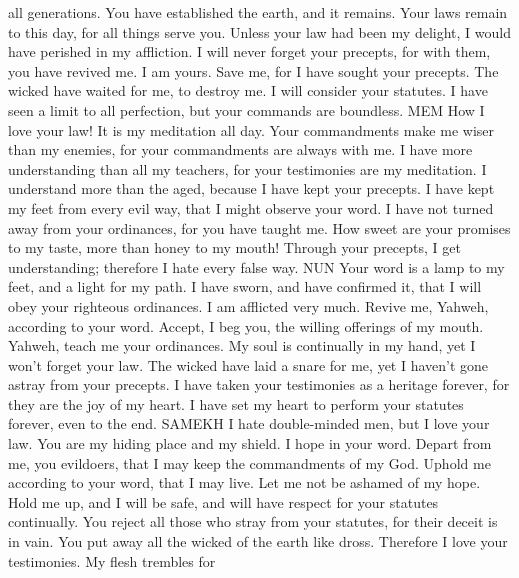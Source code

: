 all generations. You have established the earth, and it remains.
 Your laws remain to this day, for all things serve you.
 Unless your law had been my delight, I would have perished
in my affliction.  I will never forget your precepts, for
with them, you have revived me.  I am yours. Save me, for I
have sought your precepts.  The wicked have waited for me,
to destroy me. I will consider your statutes.  I have seen
a limit to all perfection, but your commands are boundless. MEM
 How I love your law! It is my meditation all day.
 Your commandments make me wiser than my enemies, for your
commandments are always with me.  I have more understanding
than all my teachers, for your testimonies are my meditation.
 I understand more than the aged, because I have kept your
precepts.  I have kept my feet from every evil way, that I
might observe your word.  I have not turned away from your
ordinances, for you have taught me.  How sweet are your
promises to my taste, more than honey to my mouth! 
Through your precepts, I get understanding; therefore I hate every false
way. NUN  Your word is a lamp to my feet, and a light for
my path.  I have sworn, and have confirmed it, that I will
obey your righteous ordinances.  I am afflicted very much.
Revive me, Yahweh, according to your word.  Accept, I beg
you, the willing offerings of my mouth. Yahweh, teach me your
ordinances.  My soul is continually in my hand, yet I
won't forget your law.  The wicked have laid a snare for
me, yet I haven't gone astray from your precepts.  I have
taken your testimonies as a heritage forever, for they are the joy of my
heart.  I have set my heart to perform your statutes
forever, even to the end. SAMEKH  I hate double-minded
men, but I love your law.  You are my hiding place and my
shield. I hope in your word.  Depart from me, you
evildoers, that I may keep the commandments of my God. 
Uphold me according to your word, that I may live. Let me not be ashamed
of my hope.  Hold me up, and I will be safe, and will have
respect for your statutes continually.  You reject all
those who stray from your statutes, for their deceit is in vain.
 You put away all the wicked of the earth like dross.
Therefore I love your testimonies.  My flesh trembles for

